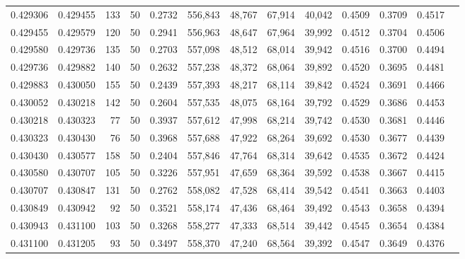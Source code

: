 \begin{tabular}{rrrrrrrrrrrrr}
0.429306 & 0.429455 &   133 &  50 &                                     0.2732 & 556,843 &  48,767 &  67,914 &  40,042 & 0.4509 & 0.3709 & 0.4517 \\
0.429455 & 0.429579 &   120 &  50 &                                     0.2941 & 556,963 &  48,647 &  67,964 &  39,992 & 0.4512 & 0.3704 & 0.4506 \\
0.429580 & 0.429736 &   135 &  50 &                                     0.2703 & 557,098 &  48,512 &  68,014 &  39,942 & 0.4516 & 0.3700 & 0.4494 \\
0.429736 & 0.429882 &   140 &  50 &                                     0.2632 & 557,238 &  48,372 &  68,064 &  39,892 & 0.4520 & 0.3695 & 0.4481 \\
0.429883 & 0.430050 &   155 &  50 &                                     0.2439 & 557,393 &  48,217 &  68,114 &  39,842 & 0.4524 & 0.3691 & 0.4466 \\
0.430052 & 0.430218 &   142 &  50 &                                     0.2604 & 557,535 &  48,075 &  68,164 &  39,792 & 0.4529 & 0.3686 & 0.4453 \\
0.430218 & 0.430323 &    77 &  50 &                                     0.3937 & 557,612 &  47,998 &  68,214 &  39,742 & 0.4530 & 0.3681 & 0.4446 \\
0.430323 & 0.430430 &    76 &  50 &                                     0.3968 & 557,688 &  47,922 &  68,264 &  39,692 & 0.4530 & 0.3677 & 0.4439 \\
0.430430 & 0.430577 &   158 &  50 &                                     0.2404 & 557,846 &  47,764 &  68,314 &  39,642 & 0.4535 & 0.3672 & 0.4424 \\
0.430580 & 0.430707 &   105 &  50 &                                     0.3226 & 557,951 &  47,659 &  68,364 &  39,592 & 0.4538 & 0.3667 & 0.4415 \\
0.430707 & 0.430847 &   131 &  50 &                                     0.2762 & 558,082 &  47,528 &  68,414 &  39,542 & 0.4541 & 0.3663 & 0.4403 \\
0.430849 & 0.430942 &    92 &  50 &                                     0.3521 & 558,174 &  47,436 &  68,464 &  39,492 & 0.4543 & 0.3658 & 0.4394 \\
0.430943 & 0.431100 &   103 &  50 &                                     0.3268 & 558,277 &  47,333 &  68,514 &  39,442 & 0.4545 & 0.3654 & 0.4384 \\
0.431100 & 0.431205 &    93 &  50 &                                     0.3497 & 558,370 &  47,240 &  68,564 &  39,392 & 0.4547 & 0.3649 & 0.4376 \\

\end{tabular}

